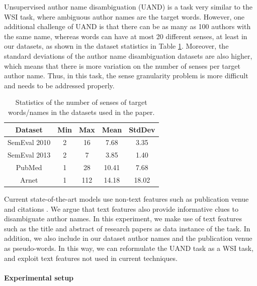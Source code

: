 \documentclass[letterpaper]{article}
\begin{document}
Unsupervised author name disambiguation (UAND) is a task very similar to the WSI task, where ambiguous author names are the target words. However, one additional challenge of UAND is that there can be as many as 100 authors with the same name, whereas words can have at most 20 different senses, at least in our datasets, as shown in the dataset statistics in Table \ref{tab:stat}. Moreover, the standard deviations of the author name disambiguation datasets are also higher, which means that there is more variation on the number of senses per target author name. Thus, in this task, the sense granularity problem is more difficult and needs to be addressed properly.

\begin{table}[t]
    \centering
    \begin{adjustbox}{width=0.74\columnwidth}
\begin{tabular}{|c|cccc|}
        \hline
        Dataset & Min & Max & Mean & StdDev \\
        \hline
        SemEval 2010 & 2 & 16 & 7.68 & 3.35 \\ \hline
        SemEval 2013 & 2 & 7 & 3.85 & 1.40 \\ \hline
        PubMed & 1 & 28 & 10.41 & 7.68 \\ \hline
        Arnet & 1 & 112 & 14.18 & 18.02 \\
        \hline
    \end{tabular}
\end{adjustbox}
    \caption{Statistics of the number of senses of target words/names in the datasets used in the paper.}
    \label{tab:stat}
\end{table}

Current state-of-the-art models use non-text features such as publication venue and citations \cite{tang2012unified}.  We argue that text features also provide informative clues to disambiguate author names. In this experiment, we make use of text features such as the title and abstract of research papers as data instance of the task. In addition, we also include in our dataset author names and the publication venue as pseudo-words. In this way, we can reformulate the UAND task as a WSI task, and exploit text features not used in current techniques.

\paragraph{Experimental setup}
\end{document}
